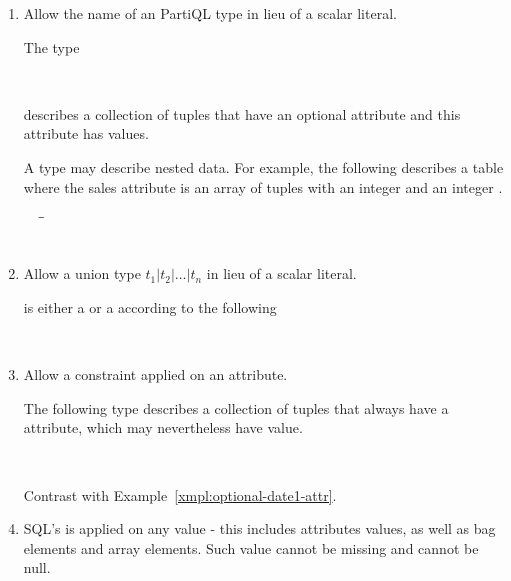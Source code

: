 {\begin{enumerate}
\item Allow the name of an PartiQL type in lieu of a scalar literal.
\begin{example}
\label{xmpl:optional-date1-attr}
The type 
\begin{tabbing}
\ \ \  
\end{tabbing}
describes a collection of tuples that have an optional  attribute and
this attribute has  values. 
\end{example}

\begin{example}
A type may describe nested data. For example, the following describes a table
where the sales attribute is an array of tuples with an integer  and
an integer .
\begin{tabbing}
\ \ \ \=\gt{\ob \{}\=\\
\>\>\\
\>\>\gt{\}\cb} 
\end{tabbing}
\end{example}

\item Allow a union type $t_1 | t_2 | \ldots | t_n$ in lieu of a scalar literal.
\begin{example}
 is either a  or a  according to the following
\begin{tabbing}
\ \ \ 
\end{tabbing}
\end{example}

\item Allow a constraint  applied on an attribute.
\begin{example}
\label{xmpl:required-date1-attr}
The following type describes a collection of tuples that always have a
 attribute, which may nevertheless have  value.
\begin{tabbing}
\ \ \  
\end{tabbing}
Contrast with Example~\ref{xmpl:optional-date1-attr}.
\end{example}

\item SQL's  is applied on any value - this includes attributes
values, as well as bag elements and array elements. Such value cannot be missing
and cannot be null.


\end{enumerate}}
